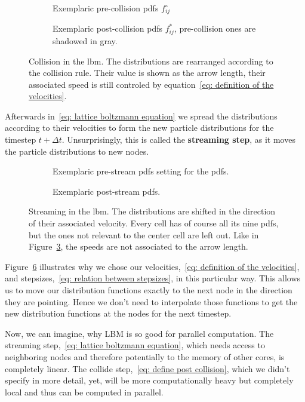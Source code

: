 \begin{figure}
\centering
\begin{subfigure}{.5\textwidth}
  \centering
  
\caption{Exemplaric pre-collision \glspl{pdf} $f_{ij}^\circ$\linebreak}
\label{fig: pre-collision example}
\end{subfigure}%
\begin{subfigure}{.5\textwidth}
  \centering
  
\caption{Exemplaric post-collision \glspl{pdf} $f_{ij}^*$, pre-collision ones are shadowed in gray.}
\label{fig: post-collision example}
\end{subfigure}
\caption{Collision in the \gls{lbm}.
The distributions are rearranged according to the collision rule.
Their value is shown as the arrow length, their associated speed is still controled by equation~\eqref{eq: definition of the velocities}.}
\label{fig: examplary collision}
\end{figure}

Afterwards in~\eqref{eq: lattice boltzmann equation} we spread the distributions according to their velocities to form the new particle distributions for the timestep $t+\Delta t$.
Unsurprisingly, this is called the \textbf{streaming step}, as it moves the particle distributions to new nodes.

\begin{figure}
\centering
\begin{subfigure}{.5\textwidth}
  \centering
  
\caption{Exemplaric pre-stream \glspl{pdf} setting for the \glspl{pdf}.}
\label{fig: pre-stream example}
\end{subfigure}%
\begin{subfigure}{.5\textwidth}
  \centering
  
  \caption{Exemplaric post-stream \glspl{pdf}.\linebreak}
\label{fig: post-stream example}
\end{subfigure}
\caption{Streaming in the \gls{lbm}.
The distributions are shifted in the direction of their associated velocity.
Every cell has of course all its nine \glspl{pdf}, but the ones not relevant to the center cell are left out.
Like in Figure~\ref{fig: examplary collision}, the speeds are not associated to the arrow length.}
\label{fig: examplary stream}
\end{figure}

Figure~\ref{fig: examplary stream} illustrates why we chose our velocities,~\eqref{eq: definition of the velocities}, and stepsizes,~\eqref{eq: relation between stepsizes}, in this particular way.
This allows us to move our distribution functions exactly to the next node in the direction they are pointing.
Hence we don't need to interpolate those functions to get the new distribution functions at the nodes for the next timestep.

Now, we can imagine, why LBM is so good for parallel computation.
The streaming step,~\eqref{eq: lattice boltzmann equation}, which needs access to neighboring nodes and therefore potentially to the memory of other cores, is completely linear.
The collide step,~\eqref{eq: define post collision}, which we didn't specify in more detail, yet, will be more computationally heavy but completely local and thus can be computed in parallel.
